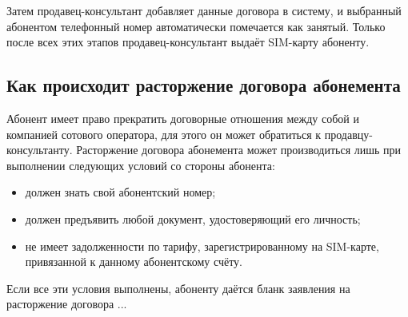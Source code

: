 Затем продавец-консультант добавляет данные договора в систему, и выбранный абонентом телефонный номер автоматически помечается как занятый. Только после всех этих этапов продавец-консультант выдаёт SIM-карту абоненту.


\subsection{Как происходит расторжение договора абонемента}


Абонент имеет право прекратить договорные отношения между собой и компанией сотового оператора, для этого он может обратиться к продавцу-консультанту. Расторжение договора абонемента может производиться лишь при выполнении следующих условий со стороны абонента:
\begin{itemize}
    \item должен знать свой абонентский номер;
    \item должен предъявить любой документ, удостоверяющий его личность;
    \item не имеет задолженности по тарифу, зарегистрированному на SIM-карте, привязанной к данному абонентскому счёту.
\end{itemize} 

Если все эти условия выполнены, абоненту даётся бланк заявления на расторжение договора ...










